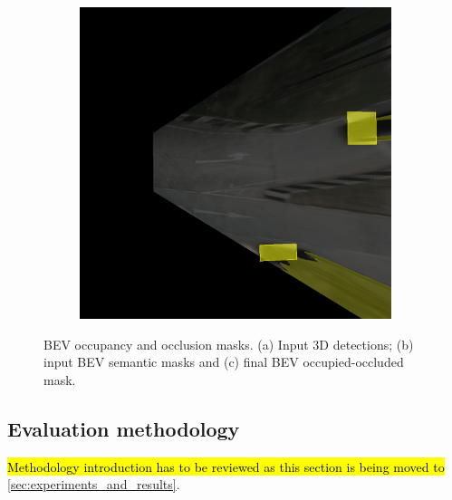 \begin{figure}[h!]
\begin{subfigure}[b]{0.3\textwidth}
        \caption{}
        \label{fig:bev_occupancy_occlusion_b}
    \end{subfigure}
    \hfill
    \begin{subfigure}[b]{0.3\textwidth}
        \includegraphics[width=\textwidth]{images/methodology/bev_occupancy_oclusion/bev_occ_9.png}
        \caption{}
        \label{fig:bev_occupancy_occlusion_c}
    \end{subfigure}

    \caption{BEV occupancy and occlusion masks. (a) Input 3D detections; (b) input BEV semantic masks and (c) final BEV occupied-occluded mask.}
    \label{fig:bev_occupancy_occlusion}
\end{figure}


\subsection{Evaluation methodology}
\label{sec:evaluacion}

\hl{Methodology introduction has to be reviewed as this section is being moved to} \ref{sec:experiments_and_results}.

